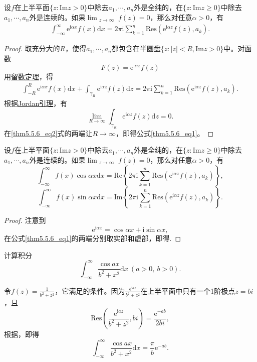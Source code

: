 \documentclass[../../main.tex]{subfiles}
\begin{document}
\begin{theorem}\label{theorem:定理5.5.6}
设$f$在上半平面$\{ z: \mathrm{Im} z > 0 \}$中除去$a_1, \cdots, a_n$外是全纯的，在$\{ z: \mathrm{Im} z \geqslant 0 \}$中除去$a_1, \cdots, a_n$外是连续的。如果$\lim_{\substack{z \to \infty}} f(z) = 0$，那么对任意$\alpha > 0$，有
\begin{align}
\int_{-\infty}^{\infty} \mathrm{e}^{\mathrm{i}\alpha x} f(x) \mathrm{d}x = 2\pi \mathrm{i} \sum_{k=1}^{n} \mathrm{Res}(\mathrm{e}^{\mathrm{i}\alpha z} f(z), a_k). \label{thm5.5.6_eq1}
\end{align}
\end{theorem}
\begin{proof}
取充分大的$R$，使得$a_1, \cdots, a_n$都包含在半圆盘$\{ z: |z| < R, \mathrm{Im} z > 0 \}$中。对函数
\[
F(z) = \mathrm{e}^{\mathrm{i}\alpha z} f(z)
\]
用\hyperref[theorem:留数定理(残数定理)-定理5.4.9]{留数定理}，得
\begin{align}
\int_{-R}^{R} \mathrm{e}^{\mathrm{i}\alpha x} f(x) \mathrm{d}x + \int_{\gamma_R} \mathrm{e}^{\mathrm{i}\alpha z} f(z) \mathrm{d}z = 2\pi \mathrm{i} \sum_{k=1}^{n} \mathrm{Res}(\mathrm{e}^{\mathrm{i}\alpha z} f(z), a_k). \label{thm5.5.6_eq2}
\end{align}
根据\hyperref[lemma:Jordan引理]{Jordan引理}，有
\[
\lim_{R \to \infty} \int_{\gamma_R} \mathrm{e}^{\mathrm{i}\alpha z} f(z) \mathrm{d}z = 0.
\]
在\eqref{thm5.5.6_eq2}式的两端让$R \to \infty$，即得公式\eqref{thm5.5.6_eq1}。
\end{proof}

\begin{corollary}\label{corollary:推论5.5.7}
设$f$在上半平面$\{ z: \mathrm{Im} z > 0 \}$中除去$a_1, \cdots, a_n$外是全纯的，在$\{ z: \mathrm{Im} z \geqslant 0 \}$中除去$a_1, \cdots, a_n$外是连续的。如果$\lim_{\substack{z \to \infty}} f(z) = 0$，那么对任意$\alpha > 0$，有
\[
\int_{-\infty}^{\infty} f(x) \cos\alpha x \mathrm{d}x = \mathrm{Re} \left\{ 2\pi \mathrm{i} \sum_{k=1}^{n} \mathrm{Res}(\mathrm{e}^{\mathrm{i}\alpha z} f(z), a_k) \right\},
\]
\[
\int_{-\infty}^{\infty} f(x) \sin\alpha x \mathrm{d}x = \mathrm{Im} \left\{ 2\pi \mathrm{i} \sum_{k=1}^{n} \mathrm{Res}(\mathrm{e}^{\mathrm{i}\alpha z} f(z), a_k) \right\}.
\]
\end{corollary}
\begin{proof}
注意到
\[
\mathrm{e}^{\mathrm{i}\alpha x} = \cos\alpha x + \mathrm{i}\sin\alpha x,
\]
在公式\eqref{thm5.5.6_eq1}的两端分别取实部和虚部，即得.
\end{proof}

\begin{example}
计算积分
\[
\int_{-\infty}^{\infty} \frac{\cos ax}{b^2 + x^2} \mathrm{d}x \ (a > 0, \ b > 0).
\]
\end{example}
\begin{solution}
令\( f(z) = \frac{1}{b^2 + z^2} \)，它满足的条件。因为\( \frac{\mathrm{e}^{\mathrm{i}az}}{b^2 + z^2} \)在上半平面中只有一个1阶极点\( z = bi \)，且
\[
\mathrm{Res}\left( \frac{\mathrm{e}^{\mathrm{i}az}}{b^2 + z^2}, bi \right) = \frac{\mathrm{e}^{-ab}}{2bi},
\]
根据，即得
\[
\int_{-\infty}^{\infty} \frac{\cos ax}{b^2 + x^2} \mathrm{d}x = \frac{\pi}{b} \mathrm{e}^{-ab}.
\]
\end{solution}
\end{document}
